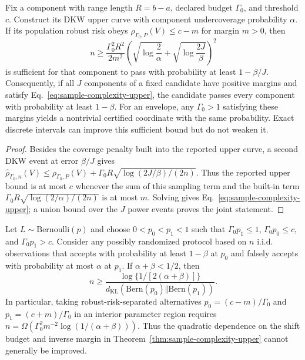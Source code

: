\begin{theorem}
\label{thm:sample-complexity-upper}
Fix a component with range length $R=b-a$, declared budget $\Gamma_0$, and
threshold $c$. Construct its DKW upper curve with component undercoverage
probability $\alpha$. If its population robust risk obeys
$\rho_{\Gamma_0,P}(V)\leq c-m$ for margin $m>0$, then
\begin{equation}
 n\geq \frac{\Gamma_0^2R^2}{2m^2}
 \left(\sqrt{\log\frac{2}{\alpha}}+
       \sqrt{\log\frac{2J}{\beta}}\right)^2
 \label{eq:sample-complexity-upper}
\end{equation}
is sufficient for that component to pass with probability at least
$1-\beta/J$. Consequently, if all $J$ components of a fixed candidate have
positive margins and satisfy Eq.~\eqref{eq:sample-complexity-upper}, the
candidate passes every component with probability at least $1-\beta$.
For an envelope, any $\Gamma_0>1$ satisfying these margins yields a nontrivial
certified coordinate with the same probability. Exact discrete intervals can
improve this sufficient bound but do not weaken it.
\end{theorem}

\begin{proof}
Besides the coverage penalty built into the reported upper curve, a second DKW
event at error $\beta/J$ gives
$\widehat\rho_{\Gamma_0,n}(V)\leq
\rho_{\Gamma_0,P}(V)+\Gamma_0R
\sqrt{\log(2J/\beta)/(2n)}$.
Thus the reported upper bound is at most $c$ whenever the sum of this sampling
term and the built-in term
$\Gamma_0R\sqrt{\log(2/\alpha)/(2n)}$ is at most $m$.
Solving gives Eq.~\eqref{eq:sample-complexity-upper}; a union bound over the
$J$ power events proves the joint statement.
\end{proof}

\begin{theorem}
\label{thm:sample-complexity-lower}
Let $L\sim\mathrm{Bernoulli}(p)$ and choose $0<p_0<p_1<1$ such that
$\Gamma_0p_1\leq1$, $\Gamma_0p_0\leq c$, and
$\Gamma_0p_1>c$. Consider any possibly randomized protocol based on $n$ i.i.d.
observations that accepts with probability at least $1-\beta$ at $p_0$ and
falsely accepts with probability at most $\alpha$ at $p_1$. If
$\alpha+\beta<1/2$, then
\begin{equation}
 n\geq
 \frac{\log\{1/[2(\alpha+\beta)]\}}
 {d_{\mathrm{KL}}(\mathrm{Bern}(p_0)\Vert
                  \mathrm{Bern}(p_1))}.
 \label{eq:sample-complexity-lower}
\end{equation}
In particular, taking robust-risk-separated alternatives
$p_0=(c-m)/\Gamma_0$ and $p_1=(c+m)/\Gamma_0$ in an interior parameter region
requires $n=\Omega(\Gamma_0^2m^{-2}\log(1/(\alpha+\beta)))$.
Thus the quadratic dependence on the shift budget and inverse margin in
Theorem~\ref{thm:sample-complexity-upper} cannot generally be improved.
\end{theorem}

